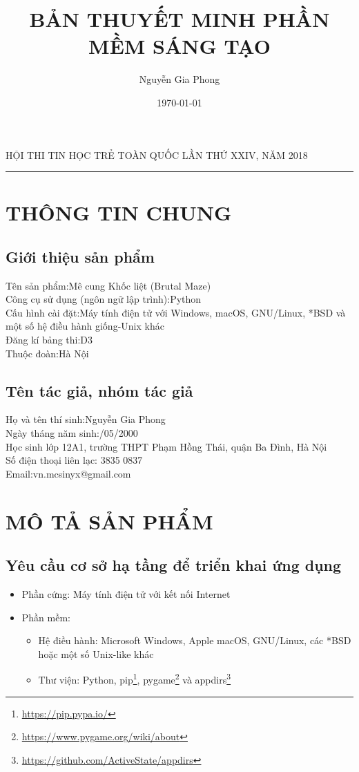 \documentclass[a4paper,12pt]{article}
\title{BẢN THUYẾT MINH PHẦN MỀM SÁNG TẠO}
\author{Nguyễn Gia Phong}
\date{\today}
\begin{document}
\begin{center}
HỘI THI TIN HỌC TRẺ TOÀN QUỐC LẦN THỨ XXIV, NĂM 2018
\rule{0.7\textwidth}{0.4pt}
\end{center}
{\let\newpage\relax\maketitle}
\tableofcontents

\newpage
\renewcommand*{\thefootnote}{\fnsymbol{footnote}}
\section{THÔNG TIN CHUNG}
\subsection{Giới thiệu sản phẩm}
Tên sản phẩm:\quad Mê cung Khốc liệt (Brutal Maze)\\
Công cụ sử dụng (ngôn ngữ lập trình):\qquad Python\\
Cấu hình cài đặt:\qquad Máy tính điện tử với Windows, macOS, GNU/Linux, *BSD
và một số hệ điều hành giống-Unix khác\\
Đăng kí bảng thi:\qquad D3\\
Thuộc đoàn:\qquad Hà Nội

\subsection{Tên tác giả, nhóm tác giả}
Họ và tên thí sinh:\qquad Nguyễn Gia Phong\\
Ngày tháng năm sinh:/05/2000\\
Học sinh lớp 12A1, trường THPT Phạm Hồng Thái, quận Ba Đình, Hà Nội\\
Số điện thoại liên lạc: 3835 0837\\
Email:\qquad vn.mcsinyx@gmail.com

\section{MÔ TẢ SẢN PHẨM}
\subsection{Yêu cầu cơ sở hạ tầng để triển khai ứng dụng}
\begin{itemize}
  \item Phần cứng: Máy tính điện tử với kết nối Internet
  \item Phần mềm:
    \begin{itemize}
      \item Hệ điều hành: Microsoft Windows, Apple macOS, GNU/Linux, các *BSD
        hoặc một số Unix-like khác
      \item Thư viện: Python, pip\footnote{\url{https://pip.pypa.io/}},
        pygame\footnote{\url{https://www.pygame.org/wiki/about}} và
        appdirs\footnote{\url{https://github.com/ActiveState/appdirs}}
    \end{itemize}
\end{itemize}
\end{document}
